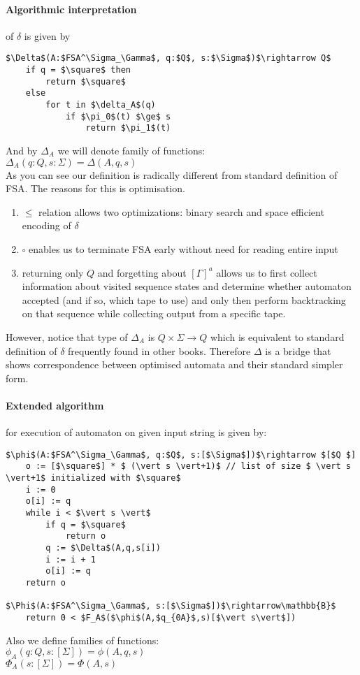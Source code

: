\documentclass[12pt]{article}
\begin{document}
\paragraph{ Algorithmic interpretation} of $\delta$ is given by  


\begin{lstlisting}
$\Delta$(A:$FSA^\Sigma_\Gamma$, q:$Q$, s:$\Sigma$)$\rightarrow Q$
    if q = $\square$ then
        return $\square$
    else
        for t in $\delta_A$(q)
            if $\pi_0$(t) $\ge$ s
                return $\pi_1$(t)
\end{lstlisting}
And by $\Delta_A$ we will denote family of functions:\\
$\Delta_A(q:Q, s:\Sigma) = \Delta(A,q,s)$  \\
As you can see our definition is radically different from standard definition of FSA. The reasons for this is optimisation. 
\begin{enumerate}
	\item $\le$ relation allows two optimizations: binary search and space efficient encoding of $\delta$
	\item $\square$ enables us to terminate FSA early without need for reading entire input
	\item returning only $Q$ and forgetting about $[\Gamma]^a$ allows us to first collect information about visited sequence states and determine whether automaton accepted (and if so, which tape to use) and only then perform backtracking on that sequence while collecting output from a specific tape.
\end{enumerate}
However, notice that type of $\Delta_A$ is $ Q \times \Sigma \rightarrow Q$ which is equivalent to standard definition of $\delta$ frequently found in other books. Therefore $\Delta$ is a bridge that shows correspondence between optimised automata and their standard simpler form. 



\paragraph{Extended algorithm } for execution of automaton on given input string is given by:
\begin{lstlisting}
$\phi$(A:$FSA^\Sigma_\Gamma$, q:$Q$, s:[$\Sigma$])$\rightarrow $[$Q $]
    o := [$\square$] * $ (\vert s \vert+1)$ // list of size $ \vert s \vert+1$ initialized with $\square$
    i := 0
    o[i] := q
    while i < $\vert s \vert$
        if q = $\square$
            return o
        q := $\Delta$(A,q,s[i])	 
        i := i + 1
        o[i] := q
    return o

$\Phi$(A:$FSA^\Sigma_\Gamma$, s:[$\Sigma$])$\rightarrow\mathbb{B}$
    return 0 < $F_A$($\phi$(A,$q_{0A}$,s)[$\vert s\vert$])
\end{lstlisting}
Also we define families of functions: \\
$\phi_A(q:Q, s:[\Sigma]) = \phi(A,q,s)$ \\
$\Phi_A(s:[\Sigma]) = \Phi(A,s)$ \\
\end{document}
